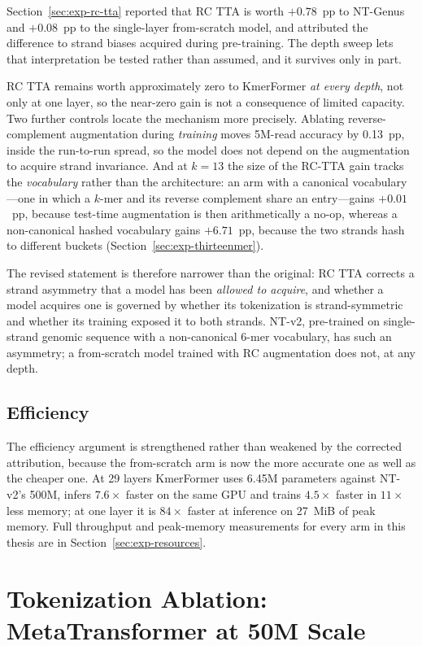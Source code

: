 Section~\ref{sec:exp-rc-tta} reported that RC TTA is worth $+0.78$~pp to NT-Genus and $+0.08$~pp to the single-layer from-scratch model, and attributed the difference to strand biases acquired during pre-training. The depth sweep lets that interpretation be tested rather than assumed, and it survives only in part.

RC TTA remains worth approximately zero to KmerFormer \emph{at every depth}, not only at one layer, so the near-zero gain is not a consequence of limited capacity. Two further controls locate the mechanism more precisely. Ablating reverse-complement augmentation during \emph{training} moves 5M-read accuracy by 0.13~pp, inside the run-to-run spread, so the model does not depend on the augmentation to acquire strand invariance. And at $k=13$ the size of the RC-TTA gain tracks the \emph{vocabulary} rather than the architecture: an arm with a canonical vocabulary---one in which a $k$-mer and its reverse complement share an entry---gains $+0.01$~pp, because test-time augmentation is then arithmetically a no-op, whereas a non-canonical hashed vocabulary gains $+6.71$~pp, because the two strands hash to different buckets (Section~\ref{sec:exp-thirteenmer}).

The revised statement is therefore narrower than the original: RC TTA corrects a strand asymmetry that a model has been \emph{allowed to acquire}, and whether a model acquires one is governed by whether its tokenization is strand-symmetric and whether its training exposed it to both strands. NT-v2, pre-trained on single-strand genomic sequence with a non-canonical 6-mer vocabulary, has such an asymmetry; a from-scratch model trained with RC augmentation does not, at any depth.

\subsection{Efficiency}

The efficiency argument is strengthened rather than weakened by the corrected attribution, because the from-scratch arm is now the more accurate one as well as the cheaper one. At 29 layers KmerFormer uses 6.45M parameters against NT-v2's 500M, infers $7.6\times$ faster on the same GPU and trains $4.5\times$ faster in $11\times$ less memory; at one layer it is $84\times$ faster at inference on 27~MiB of peak memory. Full throughput and peak-memory measurements for every arm in this thesis are in Section~\ref{sec:exp-resources}.

\section{Tokenization Ablation: MetaTransformer at 50M Scale}
\label{sec:exp-tokenization}


